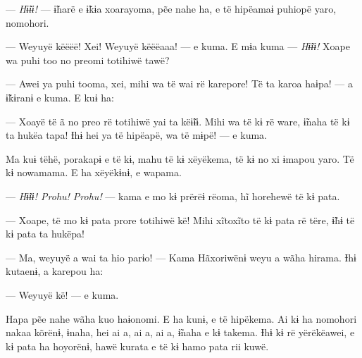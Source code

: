--- \textit{Hɨ̃ɨɨ! }--- ɨ̃harë e ɨ̃kɨa xoarayoma, pẽe nahe ha, e të hipëamaɨ puhiopë
yaro, nomohori. 

--- Weyuyë këëëë! Xei! Weyuyë këëëaaa! --- e kuma. E mɨa kuma --- \textit{Hɨ̃ɨɨ!
}Xoape wa puhi too no preomi totihiwë tawë?

--- Awei ya puhi tooma, xei, mihi wa të wai rë karepore! Të ta karoa haɨpa!
--- a ɨ̃kɨranɨ e kuma. E kuɨ ha: 

--- Xoayë të ã no preo rë totihiwë yai ta këɨ̃ɨɨ. Mihi wa të kɨ rë ware,
ɨ̃naha të kɨ ta hukëa tapa! Ɨhɨ hei ya të hipëapë, wa të mɨpë! --- e
kuma. 

Ma kuɨ tëhë, porakapɨ e të kɨ, mahu të kɨ xëyëkema, të kɨ no xi ɨmapou
yaro. Të kɨ nowamama. E ha xëyëkɨnɨ, e wapama. 

--- \textit{Hɨ̃ɨɨ!  Prohu! Prohu!} --- kama e mo kɨ prërëɨ rëoma, hĩ horehewë të kɨ
pata. 

--- Xoape, të mo kɨ pata prore totihiwë kë! Mihi xĩtoxĩto të kɨ pata rë
tëre, ɨ̃hɨ të kɨ pata ta hukëpa!

--- Ma, weyuyë a wai ta hio parɨo! --- Kama Hãxoriwënɨ weyu a wãha hirama.
Ɨhɨ kutaenɨ, a karepou ha:

--- Weyuyë kë! --- e kuma. 

Hapa pẽe nahe wãha kuo haɨonomi. E ha kunɨ, e të hipëkema. Ai kɨ ha
nomohori nakaa kõrënɨ, ɨnaha, hei ai a, ai a, ai a, ɨ̃naha e kɨ takema.
Ɨhɨ kɨ rë yërëkëawei, e kɨ pata ha hoyorënɨ, hawë kurata e të kɨ hamo
pata rii kuwë. 






